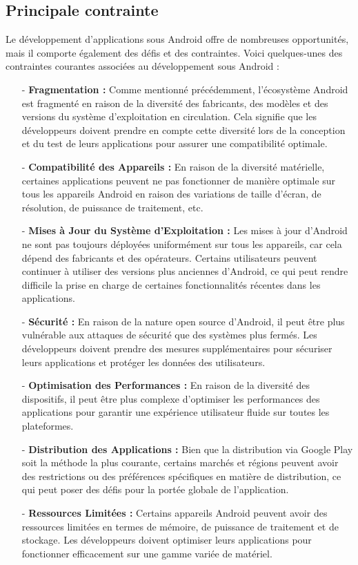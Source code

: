 \subsection{Principale contrainte}
Le développement d'applications sous Android offre de nombreuses opportunités, mais il comporte également des défis et des contraintes. Voici quelques-unes des contraintes courantes associées au développement sous Android :
\begin{itemize}
   \item[-]\textbf{Fragmentation : }Comme mentionné précédemment, l'écosystème Android est fragmenté en raison de la diversité des fabricants, des modèles et des versions du système d'exploitation en circulation. Cela signifie que les développeurs doivent prendre en compte cette diversité lors de la conception et du test de leurs applications pour assurer une compatibilité optimale.
   \item[-]\textbf{Compatibilité des Appareils :} En raison de la diversité matérielle, certaines applications peuvent ne pas fonctionner de manière optimale sur tous les appareils Android en raison des variations de taille d'écran, de résolution, de puissance de traitement, etc.
\item[-]\textbf{Mises à Jour du Système d'Exploitation : } Les mises à jour d'Android ne sont pas toujours déployées uniformément sur tous les appareils, car cela dépend des fabricants et des opérateurs. Certains utilisateurs peuvent continuer à utiliser des versions plus anciennes d'Android, ce qui peut rendre difficile la prise en charge de certaines fonctionnalités récentes dans les applications.
    \item[-]\textbf{Sécurité :}   En raison de la nature open source d'Android, il peut être plus vulnérable aux attaques de sécurité que des systèmes plus fermés. Les développeurs doivent prendre des mesures supplémentaires pour sécuriser leurs applications et protéger les données des utilisateurs.
   \item[-]\textbf{Optimisation des Performances :} En raison de la diversité des dispositifs, il peut être plus complexe d'optimiser les performances des applications pour garantir une expérience utilisateur fluide sur toutes les plateformes.
    \item[-]\textbf{Distribution des Applications :}  Bien que la distribution via Google Play soit la méthode la plus courante, certains marchés et régions peuvent avoir des restrictions ou des préférences spécifiques en matière de distribution, ce qui peut poser des défis pour la portée globale de l'application.
    \item[-]\textbf{ Ressources Limitées :} Certains appareils Android peuvent avoir des ressources limitées en termes de mémoire, de puissance de traitement et de stockage. Les développeurs doivent optimiser leurs applications pour fonctionner efficacement sur une gamme variée de matériel.
\end{itemize}
